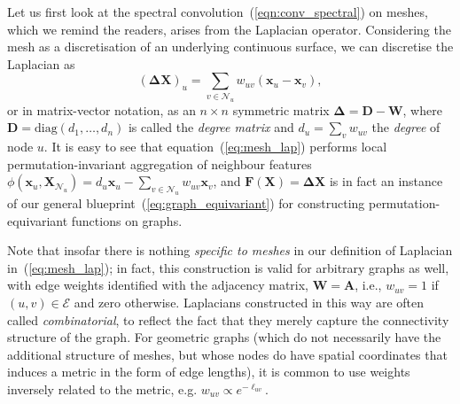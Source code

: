 Let us first look at the 
spectral convolution~(\ref{eqn:conv_spectral}) on meshes, which we remind the readers, arises from the Laplacian operator. 
%
Considering the mesh as a discretisation of an underlying continuous surface, we can discretise the Laplacian  as 
%
\begin{equation}
(\boldsymbol{\Delta}\mathbf{X})_u = \sum_{v \in \mathcal{N}_u} w_{uv} (\mathbf{x}_u - \mathbf{x}_v),  
\label{eq:mesh_lap}
\end{equation}
%
or in matrix-vector notation, as an $n\times n$ symmetric matrix $\boldsymbol{\Delta} = \mathbf{D} - \mathbf{W}$, where $\mathbf{D} = \mathrm{diag}(d_1, \hdots, d_n)$ is called the {\em degree matrix} and $d_u = \sum_{v}w_{uv}$ the {\em degree} of node $u$.  
%
It is easy to see that equation~(\ref{eq:mesh_lap}) performs  local permutation-invariant aggregation of neighbour features $\phi(\mathbf{x}_u,\mathbf{X}_{\mathcal{N}_u}) =  d_u \mathbf{x}_u - \sum_{v \in \mathcal{N}_u} w_{uv} \mathbf{x}_v$, and $\mathbf{F}(\mathbf{X}) = \boldsymbol{\Delta}\mathbf{X}$ is in fact an instance of our general blueprint~(\ref{eq:graph_equivariant}) for constructing permutation-equivariant functions on graphs. 


Note that insofar there is nothing {\em specific to meshes} in our definition of Laplacian in~(\ref{eq:mesh_lap}); in fact, this construction is valid for arbitrary graphs as well, with edge weights identified with the adjacency matrix, $\mathbf{W} = \mathbf{A}$, i.e., $w_{uv} = 1$ if $(u,v) \in \mathcal{E}$ and zero otherwise.  
%
Laplacians constructed in this way are often called {\em combinatorial}, to reflect the fact that they merely capture the connectivity structure of the graph. 
%
For geometric graphs (which do not necessarily have the additional structure of meshes, but whose nodes do have spatial coordinates that induces a metric in the form of edge lengths), it is common to use weights inversely related to the metric, e.g. $w_{uv} \propto e^{-\ell_{uv}}$. 



